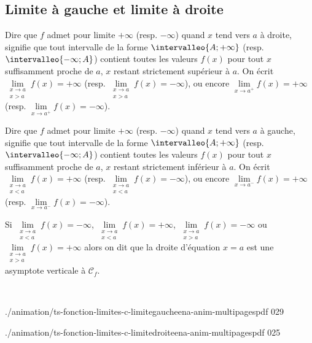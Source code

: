 \subsection{Limite à gauche et limite à droite}

\begin{dfn}
Dire que $f$ admet pour limite $+\infty$ (resp. $-\infty$) quand $x$ tend vers $a$ à droite, signifie que tout intervalle de la forme $\intervalleo{A;+\infty}$ (resp. $\intervalleo{-\infty;A}$) contient toutes les valeurs $f(x)$  pour tout $x$ suffisamment proche de $a$, $x$ restant strictement supérieur à $a$.\newline
On écrit $\lim\limits_{\substack{x\to a\\x>a}} f(x)=+\infty$ (resp. $\lim\limits_{\substack{x\to a\\x>a}} f(x)=-\infty$), ou encore $\lim\limits_{x\to a^+} f(x)=+\infty$ (resp. $\lim\limits_{x\to a^+} f(x)=-\infty$).
\end{dfn}

\begin{dfn}
Dire que $f$ admet pour limite $+\infty$ (resp. $-\infty$) quand $x$ tend vers $a$ à gauche, signifie que tout intervalle de la forme $\intervalleo{A;+\infty}$ (resp. $\intervalleo{-\infty;A}$) contient toutes les valeurs $f(x)$  pour tout $x$ suffisamment proche de $a$, $x$ restant strictement inférieur à $a$.\newline
On écrit $\lim\limits_{\substack{x\to a\\x<a}} f(x)=+\infty$ (resp. $\lim\limits_{\substack{x\to a\\x<a}} f(x)=-\infty$), ou encore $\lim\limits_{x\to a^-} f(x)=+\infty$ (resp. $\lim\limits_{x\to a^-} f(x)=-\infty$).
\end{dfn}

\begin{dfn}
Si $\lim\limits_{\substack{x\to a\\x<a}} f(x)=-\infty$, $\lim\limits_{\substack{x\to a\\x<a}} f(x)=+\infty$, $\lim\limits_{\substack{x\to a\\x>a}} f(x)=-\infty$ ou $\lim\limits_{\substack{x\to a\\x>a}} f(x)=+\infty$ alors on dit que la droite d'équation $x=a$ est une asymptote verticale à  $\mathcal C_f$.
\end{dfn}

\begin{intgr}~\newline
	\begin{minipage}{0.47\linewidth}%
%
	{./animation/ts-fonction-limites-c-limitegaucheena-anim-multipagespdf}%
	{0}{29}
   \end{minipage}
	\hfill
   \begin{minipage}{0.47\linewidth}%
%
	{./animation/ts-fonction-limites-c-limitedroiteena-anim-multipagespdf}%
	{0}{25}
   \end{minipage}
\end{intgr}

